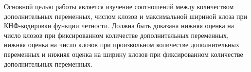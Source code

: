 
Основной целью работы является изучение соотношений между количеством дополнительных переменных, числом клозов и максимальной шириной клоза при КНФ-кодировки функции четности. Должна быть доказана нижняя оценка на число клозов при фиксированном количестве дополнительных переменных, нижняя оценка на число клозов при произвольном количестве дополнительных переменных и нижняя оценка на ширину клозов при фиксированном количестве дополнительных переменных. 